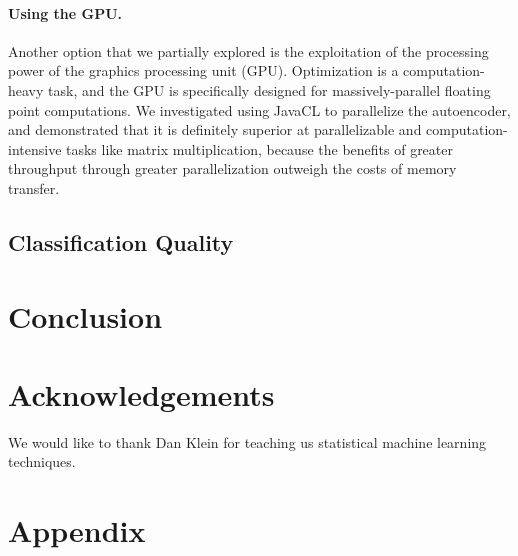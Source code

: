 \documentclass[11pt]{article}
\begin{document}
\paragraph{Using the GPU.}
Another option that we partially explored is the exploitation of the processing power of the graphics processing unit (GPU). Optimization is a computation-heavy task, and the GPU is specifically designed for massively-parallel floating point computations. We investigated using JavaCL to parallelize the autoencoder, and demonstrated that it is definitely superior at parallelizable and computation-intensive tasks like matrix multiplication, because the benefits of greater throughput through greater parallelization outweigh the costs of memory transfer.

\subsection{Classification Quality}


\section{Conclusion}

\section{Acknowledgements}
We would like to thank Dan Klein for teaching us statistical machine learning techniques.
\section*{Appendix}
\end{document}

